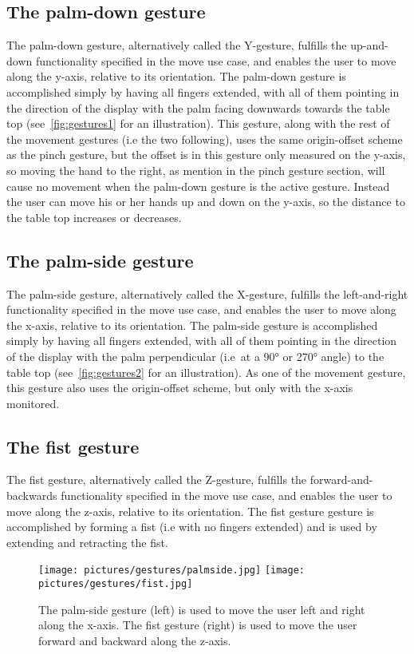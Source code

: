 \subsection{The palm-down gesture}
\label{sec:palm_down_design}
The palm-down gesture, alternatively called the Y-gesture, fulfills the up-and-down functionality specified in the move use case, and enables the user to 
move along the y-axis, relative to its orientation. The palm-down gesture is accomplished simply by having all fingers extended, with all of them pointing in
the direction of the display with the palm facing downwards towards the table top (see~\vref{fig:gestures1} for an illustration). This gesture, along with the rest of the 
movement gestures (i.e the two following), uses the same origin-offset scheme as the pinch gesture, but the offset is in this gesture only measured on the y-axis, 
so moving the hand to the 
right, as mention in the pinch gesture section, will cause no movement when the palm-down gesture is the active gesture. 
Instead the user can move his or her hands up and down on the y-axis, so the distance to the table top increases or decreases.  

\subsection{The palm-side gesture}
The palm-side gesture, alternatively called the X-gesture, fulfills the left-and-right functionality specified in the move use case, and enables the user to 
move along the x-axis, relative to its orientation. The palm-side gesture is accomplished simply by having all fingers extended, with all of them pointing in
the direction of the display with the palm perpendicular (i.e~at a 90° or 270° angle) to the table top (see~\vref{fig:gestures2} for an illustration). 
As one of the movement gesture, this gesture also uses the origin-offset scheme, but only with the x-axis monitored.

\subsection{The fist gesture}
The fist gesture, alternatively called the Z-gesture, fulfills the forward-and-backwards functionality specified in the move use case, and enables the user to 
move along the z-axis, relative to its orientation. The fist gesture gesture is accomplished by forming a fist (i.e with no fingers extended)
and is used by extending and retracting the fist. 

\begin{figure}%
	\texttt{[image: pictures/gestures/palmside.jpg]}
    \texttt{[image: pictures/gestures/fist.jpg]}
	\caption[The palm-side and fist gestures]{The palm-side gesture (left) is used to move the user left and right along the x-axis. 
             The fist gesture (right) is used to move the user forward and backward along the z-axis.}
	\label{fig:gestures2}
\end{figure} 

